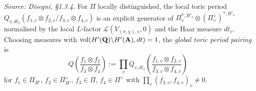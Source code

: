 \begin{definition}
  \label{def:GlobalToricPairing}
  \textit{Source: Disegni, §1.3.4.}
  For $\Pi$ locally distinguished, the local toric period
  $Q_{v,dt_v}(f_{1,v} \otimes f_{2,v} / f_{3,v} \otimes f_{4,v})$ is
  an explicit generator of $\Pi_v^{*,H'_v} \otimes (\Pi_v^\vee)^{*,H'_v}$
  normalised by the local $L$-factor $\mathscr{L}(V_{(\pi,\chi),v},0)$
  and the Haar measure $dt_v$.  Choosing measures with
  $\mathrm{vol}(H'(\mathbf{Q})\backslash H'(\mathbf{A}), dt) = 1$, the \emph{global
  toric period pairing} is
  \[
    Q\!\left(\frac{f_1 \otimes f_2}{f_3 \otimes f_4}\right)
    := \prod_v Q_{v,dt_v}\!\left(\frac{f_{1,v} \otimes f_{2,v}}
    {f_{3,v} \otimes f_{4,v}}\right)
  \]
  for $f_1 \in \Pi_{H'}$, $f_2 \in \Pi^\vee_{H'}$, $f_3 \in \Pi$,
  $f_4 \in \Pi^\vee$ with $\prod_v (f_{3,v}, f_{4,v})_v \neq 0$.
\end{definition}

